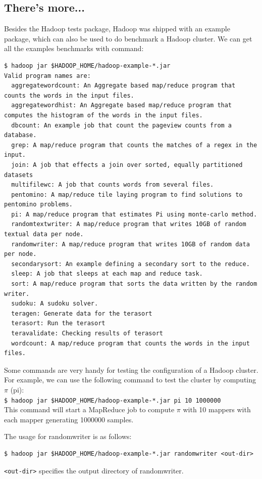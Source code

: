 \subsection*{There's more...}
Besides the Hadoop tests package, Hadoop was shipped with an example package, which can also be used to do benchmark a Hadoop cluster. We can get all the examples benchmarks with command:
\lstset{style=bashstyle}
\begin{lstlisting}
$ hadoop jar $HADOOP_HOME/hadoop-example-*.jar
Valid program names are:
  aggregatewordcount: An Aggregate based map/reduce program that counts the words in the input files.
  aggregatewordhist: An Aggregate based map/reduce program that computes the histogram of the words in the input files.
  dbcount: An example job that count the pageview counts from a database.
  grep: A map/reduce program that counts the matches of a regex in the input.
  join: A job that effects a join over sorted, equally partitioned datasets
  multifilewc: A job that counts words from several files.
  pentomino: A map/reduce tile laying program to find solutions to pentomino problems.
  pi: A map/reduce program that estimates Pi using monte-carlo method.
  randomtextwriter: A map/reduce program that writes 10GB of random textual data per node.
  randomwriter: A map/reduce program that writes 10GB of random data per node.
  secondarysort: An example defining a secondary sort to the reduce.
  sleep: A job that sleeps at each map and reduce task.
  sort: A map/reduce program that sorts the data written by the random writer.
  sudoku: A sudoku solver.
  teragen: Generate data for the terasort
  terasort: Run the terasort
  teravalidate: Checking results of terasort
  wordcount: A map/reduce program that counts the words in the input files.
\end{lstlisting}

Some commands are very handy for testing the configuration of a Hadoop cluster. For example, we can use the following command to test the cluster by computing $\pi$ (pi): \\
\verb|$ hadoop jar $HADOOP_HOME/hadoop-example-*.jar pi 10 1000000| \\
This command will start a MapReduce job to compute $\pi$ with 10 mappers with each mapper generating 1000000 samples.

The usage for randomwriter is as follows:
\lstset{style=bashstyle}
\begin{lstlisting}
$ hadoop jar $HADOOP_HOME/hadoop-example-*.jar randomwriter <out-dir>
\end{lstlisting}
\verb|<out-dir>| specifies the output directory of randomwriter.

